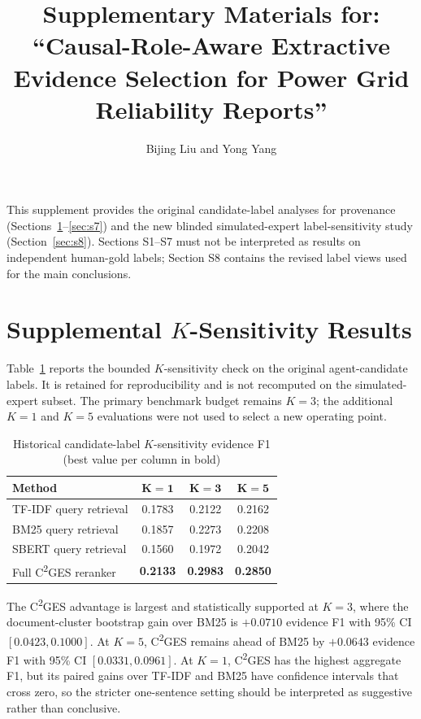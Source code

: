 \documentclass[11pt,letterpaper]{article}
\title{Supplementary Materials for:\\
``Causal-Role-Aware Extractive Evidence Selection for Power Grid Reliability Reports''}
\author{Bijing Liu and Yong Yang}
\date{}
\newcommand{\cges}{C\textsuperscript{2}GES}
\begin{document}
\maketitle

\noindent This supplement provides the original candidate-label analyses for provenance (Sections~\ref{sec:s1}--\ref{sec:s7}) and the new blinded simulated-expert label-sensitivity study (Section~\ref{sec:s8}). Sections S1--S7 must not be interpreted as results on independent human-gold labels; Section S8 contains the revised label views used for the main conclusions.

\section{Supplemental $K$-Sensitivity Results}
\label{sec:s1}

Table~\ref{tab:s1} reports the bounded $K$-sensitivity check on the original agent-candidate labels. It is retained for reproducibility and is not recomputed on the simulated-expert subset. The primary benchmark budget remains $K=3$; the additional $K=1$ and $K=5$ evaluations were not used to select a new operating point.

\begin{table}[ht]
\centering
\caption{Historical candidate-label $K$-sensitivity evidence F1 (best value per column in bold)}
\label{tab:s1}
\begin{tabular}{lccc}
\toprule
\textbf{Method} & $\mathbf{K=1}$ & $\mathbf{K=3}$ & $\mathbf{K=5}$ \\
\midrule
TF-IDF query retrieval & 0.1783 & 0.2122 & 0.2162 \\
BM25 query retrieval & 0.1857 & 0.2273 & 0.2208 \\
SBERT query retrieval & 0.1560 & 0.1972 & 0.2042 \\
Full \cges{} reranker & \textbf{0.2133} & \textbf{0.2983} & \textbf{0.2850} \\
\bottomrule
\end{tabular}
\end{table}

The \cges{} advantage is largest and statistically supported at $K=3$, where the document-cluster bootstrap gain over BM25 is $+0.0710$ evidence F1 with 95\% CI $[0.0423, 0.1000]$. At $K=5$, \cges{} remains ahead of BM25 by $+0.0643$ evidence F1 with 95\% CI $[0.0331, 0.0961]$. At $K=1$, \cges{} has the highest aggregate F1, but its paired gains over TF-IDF and BM25 have confidence intervals that cross zero, so the stricter one-sentence setting should be interpreted as suggestive rather than conclusive.
\end{document}
